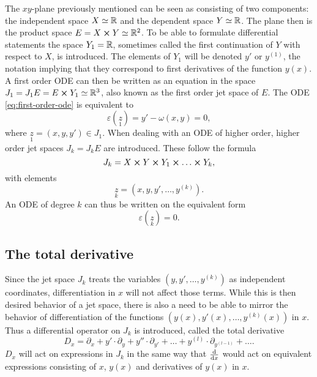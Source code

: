 The \(xy\)-plane previously mentioned can be seen as consisting of two components: the independent space \(X \simeq \mathbb{R}\) and the dependent space \(Y \simeq \mathbb{R}\).
The plane then is the product space \(E = X \cross Y \simeq \mathbb{R}^2\).
To be able to formulate differential statements the space \(Y_1 = \mathbb{R}\), sometimes called the first continuation of \(Y\) with respect to \(X\), is introduced.
The elements of \(Y_1\) will be denoted \(y'\) or \(y^{(1)}\), the notation implying that they correspond to first derivatives of the function \(y(x)\).
A first order ODE can then be written as an equation in the space \(J_1 = J_1 E = E \cross Y_1 \simeq \mathbb{R}^3\), also known as the first order jet space of \(E\).
The ODE \ref{eq:first-order-ode} is equivalent to
\begin{equation} \label{eq:first-order-jet-ode}
  \varepsilon(\underset{1}{z}) = y' - \omega(x,y) = 0,
\end{equation}
where \(\underset{1}{z} = (x,y,y') \in J_1\).
When dealing with an ODE of higher order, higher order jet spaces \(J_k = J_k E\) are introduced.
These follow the formula
\begin{equation}
  J_k = X \cross Y \cross Y_1 \cross \dots \cross Y_k,
\end{equation}
with elements
\begin{equation}
  \underset{k}{z} = (x, y, y', \dots, y^{(k)}).
\end{equation}
An ODE of degree \(k\) can thus be written on the equivalent form
\begin{equation}
  \varepsilon(\underset{k}{z}) = 0.
\end{equation}

\subsection{The total derivative}
Since the jet space \(J_k\) treats the variables \((y, y', \dots, y^{(k)})\) as independent coordinates, differentiation in \(x\) will not affect those terms.
While this is then desired behavior of a jet space, there is also a need to be able to mirror the behavior of differentiation of the functions \((y(x), y'(x), \dots, y^{(k)}(x))\) in \(x\).
Thus a differential operator on \(J_k\) is introduced, called the total derivative
\begin{equation}
  D_x = \partial_x + y' \cdot \partial_y + y'' \cdot \partial_{y'} + \dots + y^{(l)} \cdot \partial_{y^{(l-1)}} + \dots .
\end{equation}
\(D_x\) will act on expressions in \(J_k\) in the same way that \(\dv{x}\) would act on equivalent expressions consisting of \(x\), \(y(x)\) and derivatives of \(y(x)\) in \(x\).

